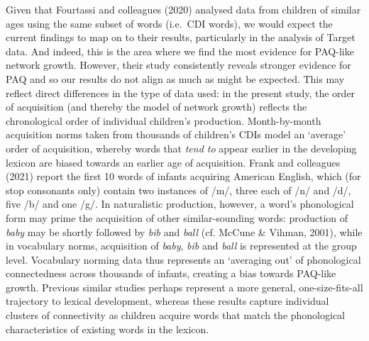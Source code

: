 \documentclass[
  man,mask,floatsintext]{apa6}
\begin{document}
Given that Fourtassi and colleagues (2020) analysed data from children of similar ages using the same subset of words (i.e.~CDI words), we would expect the current findings to map on to their results, particularly in the analysis of Target data. And indeed, this is the area where we find the most evidence for PAQ-like network growth. However, their study consistently reveals stronger evidence for PAQ and so our results do not align as much as might be expected. This may reflect direct differences in the type of data used: in the present study, the order of acquisition (and thereby the model of network growth) reflects the chronological order of individual children's production. Month-by-month acquisition norms taken from thousands of children's CDIs model an `average' order of acquisition, whereby words that \emph{tend to} appear earlier in the developing lexicon are biased towards an earlier age of acquisition. Frank and colleagues (2021) report the first 10 words of infants acquiring American English, which (for stop consonants only) contain two instances of /m/, three each of /n/ and /d/, five /b/ and one /g/. In naturalistic production, however, a word's phonological form may prime the acquisition of other similar-sounding words: production of \emph{baby} may be shortly followed by \emph{bib} and \emph{ball} (cf. McCune \& Vihman, 2001), while in vocabulary norms, acquisition of \emph{baby}, \emph{bib} and \emph{ball} is represented at the group level. Vocabulary norming data thus represents an `averaging out' of phonological connectedness across thousands of infants, creating a bias towards PAQ-like growth. Previous similar studies perhaps represent a more general, one-size-fits-all trajectory to lexical development, whereas these results capture individual clusters of connectivity as children acquire words that match the phonological characteristics of existing words in the lexicon.
\end{document}
